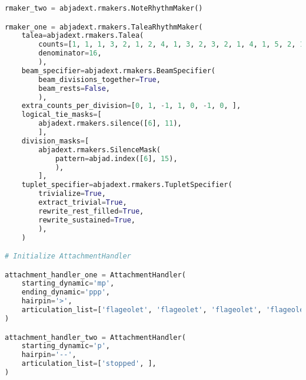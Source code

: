 \begin{lstlisting}[language=Python, caption=Invocation Source Code]
rmaker_two = abjadext.rmakers.NoteRhythmMaker()

rmaker_one = abjadext.rmakers.TaleaRhythmMaker(
    talea=abjadext.rmakers.Talea(
        counts=[1, 1, 1, 3, 2, 1, 2, 4, 1, 3, 2, 3, 2, 1, 4, 1, 5, 2, 1, 3, ],
        denominator=16,
        ),
    beam_specifier=abjadext.rmakers.BeamSpecifier(
        beam_divisions_together=True,
        beam_rests=False,
        ),
    extra_counts_per_division=[0, 1, -1, 1, 0, -1, 0, ],
    logical_tie_masks=[
        abjadext.rmakers.silence([6], 11),
        ],
    division_masks=[
        abjadext.rmakers.SilenceMask(
            pattern=abjad.index([6], 15),
            ),
        ],
    tuplet_specifier=abjadext.rmakers.TupletSpecifier(
        trivialize=True,
        extract_trivial=True,
        rewrite_rest_filled=True,
        rewrite_sustained=True,
        ),
    )

# Initialize AttachmentHandler

attachment_handler_one = AttachmentHandler(
    starting_dynamic='mp',
    ending_dynamic='ppp',
    hairpin='>',
    articulation_list=['flageolet', 'flageolet', 'flageolet', 'flageolet',   'stopped',  'stopped', '',  '', 'flageolet', 'halfopen',  'halfopen',  'halfopen',  'flageolet',  '',  '',  '', 'halfopen',   'flageolet', 'halfopen',  'stopped',   'stopped',  'stopped',  'stopped',  'stopped',  'stopped',  'stopped',  'stopped',  'stopped',  'stopped', '', ],
)

attachment_handler_two = AttachmentHandler(
    starting_dynamic='p',
    hairpin='--',
    articulation_list=['stopped', ],
)


\end{lstlisting}
